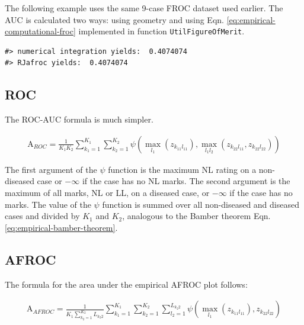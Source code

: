 \documentclass[
]{book}
\begin{document}
The following example uses the same 9-case FROC dataset used earlier. The AUC is calculated two ways: using geometry and using Eqn. \eqref{eq:empirical-computational-froc} implemented in function \texttt{UtilFigureOfMerit}.

\begin{verbatim}
#> numerical integration yields:  0.4074074
#> RJafroc yields:  0.4074074
\end{verbatim}

\hypertarget{roc}{%
\subsection{ROC}\label{roc}}

The ROC-AUC formula is much simpler.

\begin{equation}
\begin{aligned}
\text{A}_{ROC} = \frac{1}{K_1K_2}\sum_{k_1=1}^{K_1}\sum_{k_2=1}^{K_2} \psi\left ( \max_{l_1}\left (z_{k_11l_11} \right ), \max_{l_1l_2}\left (z_{k_22l_11}, z_{k_22l_22}  \right ) \right )
\end{aligned}
\label{eq:empirical-computational-roc}
\end{equation}

The first argument of the \(\psi\) function is the maximum NL rating on a non-diseased case or \(-\infty\) if the case has no NL marks. The second argument is the maximum of all marks, NL or LL, on a diseased case, or \(-\infty\) if the case has no marks. The value of the \(\psi\) function is summed over all non-diseased and diseased cases and divided by \(K_1\) and \(K_2\), analogous to the Bamber theorem Eqn. \eqref{eq:empirical-bamber-theorem}.

\hypertarget{afroc}{%
\subsection{AFROC}\label{afroc}}

The formula for the area under the empirical AFROC plot follows:

\begin{equation}
\begin{aligned}
\text{A}_{AFROC} = \frac{1}{K_1\sum_{k_2=1}^{K_2}L_{k_2 2}}\sum_{k_1=1}^{K_1}\sum_{k_2=1}^{K_2}\sum_{l_2=1}^{L_{k_2 2}} \psi\left ( \max_{l_1}\left (z_{k_11l_11}  \right ),z_{k_22l_22} \right )
\end{aligned}
\label{eq:empirical-computational-afroc}
\end{equation}
\end{document}
